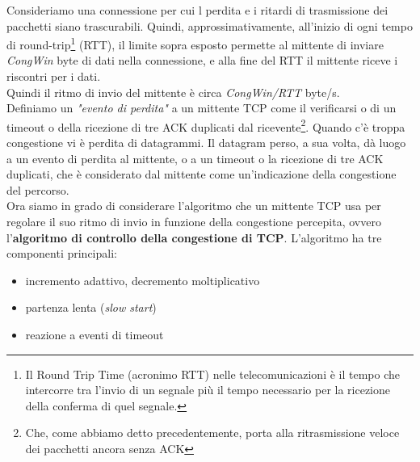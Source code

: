 \documentclass[11pt,a4paper]{book}
\begin{document}
Consideriamo una connessione per cui l perdita e i ritardi di trasmissione dei pacchetti siano trascurabili. Quindi, approssimativamente, all'inizio di ogni tempo di round-trip\footnote{Il Round Trip Time (acronimo RTT) nelle telecomunicazioni è il tempo che intercorre tra l'invio di un segnale più il tempo necessario per la ricezione della conferma di quel segnale.} (RTT), il limite sopra esposto permette al mittente di inviare \emph{CongWin} byte di dati nella connessione, e alla fine del RTT il mittente riceve i riscontri per i dati. \\
Quindi il ritmo di invio del mittente è circa \emph{CongWin/RTT} byte/s. \\
Definiamo un \textit{"evento di perdita"} a un mittente TCP come il verificarsi o di un timeout o della ricezione di tre ACK duplicati dal ricevente\footnote{Che, come abbiamo detto precedentemente, porta alla ritrasmissione veloce dei pacchetti ancora senza ACK}. Quando c'è troppa congestione vi è perdita di datagrammi. Il datagram perso, a sua volta, dà luogo a un evento di perdita al mittente, o a un timeout o la ricezione di tre ACK duplicati, che è considerato dal mittente come un'indicazione della congestione del percorso. \\
Ora siamo in grado di considerare l'algoritmo che un mittente TCP usa per regolare il suo ritmo di invio in funzione della congestione percepita, ovvero l'\textbf{algoritmo di controllo della congestione di TCP}. L'algoritmo ha tre componenti principali:
\begin{itemize}
	\item incremento adattivo, decremento moltiplicativo
	\item partenza lenta (\textit{slow start})
	\item reazione a eventi di timeout
\end{itemize}
\end{document}
